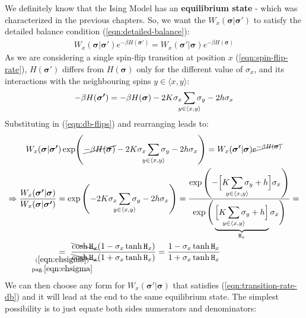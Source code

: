 \documentclass[../../main.tex]{subfiles}
\begin{document}
We definitely know that the Ising Model has an \textbf{equilibrium state} - which was characterized in the previous chapters. So, we want the $W_x(\bm{\sigma}|\bm{\sigma'})$ to satisfy the detailed balance condition (\ref{eqn:detailed-balance}):
\begin{align}\label{eqn:db-flips}
    W_x(\bm{\sigma}|\bm{\sigma'}) e^{-\beta H(\bm{\sigma'})} = W_x(\bm{\sigma'}|\bm{\sigma}) e^{-\beta H(\bm{\sigma})}
\end{align}
As we are considering a single spin-flip transition at position $x$ (\ref{eqn:spin-flip-rate}), $H(\bm{\sigma'})$ differs from $H(\bm{\sigma})$ only for the different value of $\sigma_x$, and its interactions with the neighbouring spins $y \in \langle x,y \rangle$:
\begin{align*}
    -\beta H(\bm{\sigma'}) = -\beta H(\bm{\sigma}) - 2K \sigma_x \sum_{\mathclap{y \in \langle x,y \rangle}} \sigma_y - 2h \sigma_x
\end{align*}
Substituting in (\ref{eqn:db-flips}) and rearranging leads to:
\begin{align} \nonumber
    W_x(\bm{\sigma}|\bm{\sigma'}) \exp({\cancel{-\beta H(\bm{\sigma}) }- 2 K \sigma_x} \sum_{\mathclap{y \in \langle x,y \rangle}}\sigma_y - 2 h \sigma_x) = W_x(\bm{\sigma'}|\bm{\sigma}) \cancel{e^{-\beta H(\bm{\sigma})}} \span \\ \nonumber
    \Rightarrow \frac{W_x(\bm{\sigma'}|\bm{\sigma})}{W_x(\bm{\sigma}|\bm{\sigma'})} &= \exp\left(-2 K \sigma_x \sum_{\mathclap{y \in \langle x,y \rangle}}\sigma_y - 2 h \sigma_x\right) 
    = \frac{\displaystyle \exp\left(-\Big[ K \sum_{\mathclap{y \in \langle x,y \rangle}} \sigma_y + h \Big] \sigma_x \right)}{\displaystyle \exp\Bigg(\underbrace{\Big[ K \sum_{\mathclap{y \in \langle x,y \rangle}} \sigma_y + h\Big] }_{\mathtt{H}_x}\sigma_x\Bigg)} = \\
    &\underset{\mathclap{\substack{(\ref{eqn:ehsigma})\\\text{pag.} \pageref{eqn:ehsigma}}}}{=}\>\,  \frac{\bcancel{\cosh \mathtt{H}_x }(1 - \sigma_x \tanh \mathtt{H}_x)}{\bcancel{\cosh \mathtt{H}_x }(1+ \sigma_x \tanh \mathtt{H}_x)} = \frac{1-\sigma_x \tanh \mathtt{H}_x}{1 + \sigma_x \tanh \mathtt{H}_x} \label{eqn:transition-rate-db}
\end{align}
We can then choose any form for $W_x(\bm{\sigma'}|\bm{\sigma})$ that satisfies (\ref{eqn:transition-rate-db}) and it will lead at the end to the same equilibrium state. The simplest possibility is to just equate both sides numerators and denominators:
\end{document}
